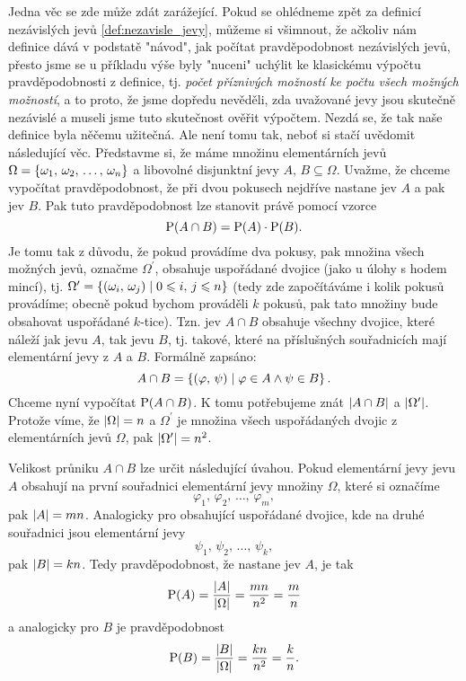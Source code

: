 Jedna věc se zde může zdát zarážející. Pokud se ohlédneme zpět za definicí nezávislých jevů \ref{def:nezavisle_jevy}, můžeme si všimnout, že ačkoliv nám definice dává v podstatě "návod", jak počítat pravděpodobnost nezávislých jevů, přesto jsme se u příkladu výše byly "nuceni" uchýlit ke klasickému výpočtu pravděpodobnosti z definice, tj. \emph{počet příznivých možností ke počtu všech možných možností}, a to proto, že jsme dopředu nevěděli, zda uvažované jevy jsou skutečně nezávislé a museli jsme tuto skutečnost ověřit výpočtem. Nezdá se, že tak naše definice byla něčemu užitečná. Ale není tomu tak, neboť si stačí uvědomit následující věc. Představme si, že máme množinu elementárních jevů $\Omega=\left\{\omega_1,\,\omega_2,\,\dots,\,\omega_n\right\}$ a libovolné disjunktní jevy $A,\,B\subseteq\Omega$. Uvažme, že chceme vypočítat pravděpodobnost, že při dvou pokusech nejdříve nastane jev $A$ a pak jev $B$. Pak tuto pravděpodobnost lze stanovit právě pomocí vzorce
\[\operatorname{\text{P}}(A\cap B)=\operatorname{\text{P}}(A)\cdot\operatorname{\text{P}}(B).\]
Je tomu tak z důvodu, že pokud provádíme dva pokusy, pak množina všech možných jevů, označme $\Omega^\prime$, obsahuje uspořádané dvojice (jako u úlohy s hodem mincí), tj. $\Omega^\prime=\left\{(\omega_i,\,\omega_j)\;\middle\vert\; 0\leqslant i,\,j\leqslant n\right\}$ (tedy zde započítáváme i kolik pokusů provádíme; obecně pokud bychom prováděli $k$ pokusů, pak tato množiny bude obsahovat uspořádané $k$-tice). Tzn. jev $A\cap B$ obsahuje všechny dvojice, které náleží jak jevu $A$, tak jevu $B$, tj. takové, které na příslušných souřadnicích mají elementární jevy z $A$ a $B$. Formálně zapsáno:
\[A\cap B=\left\{(\varphi,\,\psi)\;\middle\vert\;\varphi\in A \land \psi\in B\right\}.\]
Chceme nyní vypočítat $\operatorname{\text{P}}(A\cap B)$. K tomu potřebujeme znát $\left| A\cap B \right|$ a $\left| \Omega^\prime \right|$. Protože víme, že $\left| \Omega \right|=n$ a $\Omega^\prime$ je množina všech uspořádaných dvojic z elementárních jevů $\Omega$, pak $\left| \Omega^\prime \right|=n^2$.\par
Velikost průniku $A\cap B$ lze určit následující úvahou. Pokud elementární jevy jevu $A$ obsahují na první souřadnici elementární jevy množiny $\Omega$, které si označíme
\[\varphi_1,\,\varphi_2,\,\dots,\,\varphi_m,\]
pak $\left| A \right|=mn$. Analogicky pro obsahující uspořádané dvojice, kde na druhé souřadnici jsou elementární jevy
\[\psi_1,\,\psi_2,\,\dots,\,\psi_k,\]
pak $\left| B \right|=kn$. Tedy pravděpodobnost, že nastane jev $A$, je tak
\[\operatorname{\text{P}}(A)=\dfrac{\left| A \right|}{\left| \Omega \right|}=\dfrac{mn}{n^2}=\dfrac{m}{n}\]
a analogicky pro $B$ je pravděpodobnost
\[\operatorname{\text{P}}(B)=\dfrac{\left| B \right|}{\left| \Omega \right|}=\dfrac{kn}{n^2}=\dfrac{k}{n}.\]
